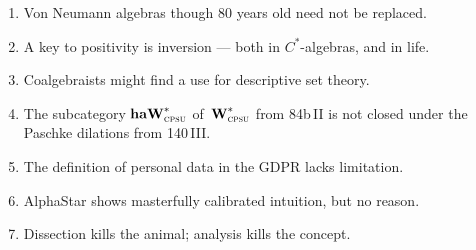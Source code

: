 \documentclass{article}
\begin{document}
\begin{enumerate}
\item
Von Neumann algebras
though 80 years old
need not be replaced.
\item
A key to positivity is inversion --- both in  $C^*$-algebras,
and in life.
\item
Coalgebraists might find a use
for  descriptive set theory.
\item
    The subcategory $\textbf{haW}^*_\text{\textsc{cpsu}}$
        of~$\textbf{W}^*_\text{\textsc{cpsu}}$ from
        \textsf{84b\,II}
        is not closed under the
         Paschke dilations from \textsf{140\,III}.

\item
The definition of personal data
in the GDPR lacks limitation.
\item
AlphaStar shows masterfully calibrated
intuition, but no reason.
\item
Dissection kills the animal;
analysis kills the concept.
\end{enumerate}
\end{document}

